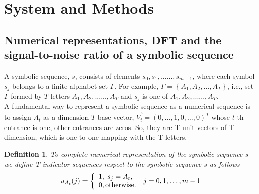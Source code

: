 \documentclass[preprint,authoryear,12pt]{elsarticle}
\newtheorem{definition}{Definition}[section]\newtheorem{theory}{Theory}
\begin{document}
\section{System and Methods}
\subsection{Numerical representations, DFT and the signal-to-noise ratio of a symbolic sequence }
A symbolic sequence, $s$, consists of elements $s_0 ,s_1 ,......,s_{m - 1} $, where each symbol $s_j $ belongs to a finite alphabet set $\Gamma$.  For example, $\Gamma  = \left\{ {A_1 ,A_2 , \ldots ,A_T } \right\}$, i.e., set $\Gamma$  formed by $T$  letters $A_1 ,A_2 ,......,A_T $ and $s_j $ is one of $A_1 ,A_2 ,......,A_T $.\\
A fundamental way to represent a symbolic sequence as a numerical sequence is to assign $A_t $ as a dimension $T$  base vector, $\overrightarrow{V_t }  = (0, \ldots ,1,0, \ldots ,0)^T$ whose $t$-th entrance is one, other entrances are zeros. So, they are T unit vectors of T dimension, which is one-to-one mapping with the T letters. \\
\begin{definition}
 To complete numerical representation of the symbolic sequence s we define T indicator sequences respect to the symbolic sequence $s$ as follows\\
 $$
u_{A_t } (j) = \left\{ \begin{array}{l}
 1,\;s_j  = A_t , \\
 0,{\rm{otherwise}}. \\
 \end{array} \right.\;j = 0,1, \ldots ,m - 1
$$
\end{definition}
\end{document}
